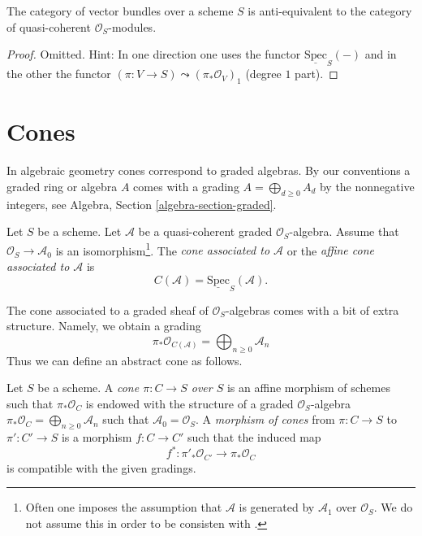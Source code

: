 \begin{lemma}
\label{lemma-category-vector-bundles}
The category of vector bundles over a scheme $S$ is
anti-equivalent to the category of quasi-coherent $\mathcal{O}_S$-modules.
\end{lemma}

\begin{proof}
Omitted. Hint: In one direction one uses the functor
$\underline{\text{Spec}}_S(-)$ and in the other the functor
$(\pi : V \to S) \leadsto (\pi_*\mathcal{O}_V)_1$ (degree $1$ part).
\end{proof}




\section{Cones}
\label{section-cone}

\noindent
In algebraic geometry cones correspond to graded algebras. By our conventions
a graded ring or algebra $A$ comes with a grading
$A = \bigoplus_{d \geq 0} A_d$ by the nonnegative integers, see
Algebra, Section \ref{algebra-section-graded}.

\begin{definition}
\label{definition-cone}
Let $S$ be a scheme. Let $\mathcal{A}$ be a quasi-coherent
graded $\mathcal{O}_S$-algebra. Assume that $\mathcal{O}_S \to \mathcal{A}_0$
is an isomorphism\footnote{Often one imposes the assumption that
$\mathcal{A}$ is generated by $\mathcal{A}_1$ over $\mathcal{O}_S$. We do not
assume this in order to be consisten with \cite[II, (8.3.1)]{EGA}.}.
The {\it cone associated to $\mathcal{A}$} or the
{\it affine cone associated to $\mathcal{A}$}
is
$$
C(\mathcal{A}) = \underline{\text{Spec}}_S(\mathcal{A}).
$$
\end{definition}

\noindent
The cone associated to a graded sheaf of $\mathcal{O}_S$-algebras
comes with a bit of extra structure. Namely, we obtain a grading
$$
\pi_*\mathcal{O}_{C(\mathcal{A})} =
\bigoplus\nolimits_{n \geq 0} \mathcal{A}_n
$$
Thus we can define an abstract cone as follows.

\begin{definition}
\label{definition-abstract-cone}
Let $S$ be a scheme. A {\it cone $\pi : C \to S$ over $S$} is an
affine morphism of schemes such that $\pi_*\mathcal{O}_C$ is endowed with
the structure of a graded $\mathcal{O}_S$-algebra
$\pi_*\mathcal{O}_C = \bigoplus\nolimits_{n \geq 0} \mathcal{A}_n$
such that $\mathcal{A}_0 = \mathcal{O}_S$. A {\it morphism of cones}
from $\pi : C \to S$ to $\pi' : C' \to S$
is a morphism $f : C \to C'$ such that the induced map
$$
f^* : \pi'_*\mathcal{O}_{C'} \longrightarrow \pi_*\mathcal{O}_C
$$
is compatible with the given gradings.
\end{definition}

